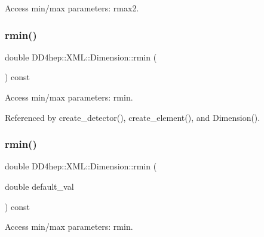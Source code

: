 Access min/max parameters\+: rmax2. 

\hypertarget{struct_d_d4hep_1_1_x_m_l_1_1_dimension_a2da6a78b6ac95555cc835a19729f455a}{}\label{struct_d_d4hep_1_1_x_m_l_1_1_dimension_a2da6a78b6ac95555cc835a19729f455a} 
\subsubsection{\texorpdfstring{rmin()}{rmin()}\hspace{0.1cm}{\footnotesize\ttfamily [1/2]}}
{\footnotesize\ttfamily double D\+D4hep\+::\+X\+M\+L\+::\+Dimension\+::rmin (\begin{DoxyParamCaption}{ }\end{DoxyParamCaption}) const}



Access min/max parameters\+: rmin. 



Referenced by create\+\_\+detector(), create\+\_\+element(), and Dimension().

\hypertarget{struct_d_d4hep_1_1_x_m_l_1_1_dimension_a4ffbddca3b9e93e915eab90ec9a8c497}{}\label{struct_d_d4hep_1_1_x_m_l_1_1_dimension_a4ffbddca3b9e93e915eab90ec9a8c497} 
\subsubsection{\texorpdfstring{rmin()}{rmin()}\hspace{0.1cm}{\footnotesize\ttfamily [2/2]}}
{\footnotesize\ttfamily double D\+D4hep\+::\+X\+M\+L\+::\+Dimension\+::rmin (\begin{DoxyParamCaption}\item[{double}]{default\+\_\+val }\end{DoxyParamCaption}) const}



Access min/max parameters\+: rmin. 

\hypertarget{struct_d_d4hep_1_1_x_m_l_1_1_dimension_ad3449140dd8723be6c9895ae03ccfe79}{}\label{struct_d_d4hep_1_1_x_m_l_1_1_dimension_ad3449140dd8723be6c9895ae03ccfe79} 
